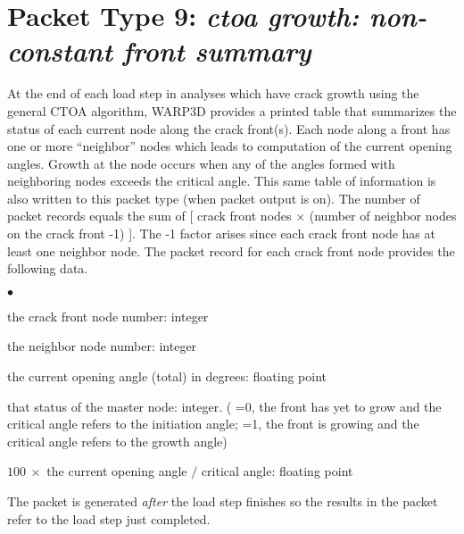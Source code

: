 \documentclass[10pt]{report}
\numberwithin{equation}{section}
\newcommand{\ti}{\emph}
\newcommand{\squishlist}{
 \begin{list}{$\bullet$}
  { \setlength{\itemsep}{0pt}
     \setlength{\parsep}{3pt}
     \setlength{\topsep}{3pt}
     \setlength{\partopsep}{0pt}
     \setlength{\leftmargin}{1.5em}
     \setlength{\labelwidth}{1em}
     \setlength{\labelsep}{0.5em} } }
\newcommand{\squishend}{
  \end{list}  }
\begin{document}
%
%
\section{Packet Type 9: \ti{ctoa growth: non-constant front summary}}
At the end of each load step in analyses which have crack growth using the 
general CTOA algorithm, WARP3D provides a printed table that summarizes 
the status of each current node along the crack front(s). Each node along a 
front has one or more ``neighbor'' nodes which leads to computation of the 
current opening angles. Growth at the node occurs when any of the angles 
formed with neighboring nodes exceeds the critical angle. This same table 
of information is also written to this packet type (when packet output is on).
The number of packet records equals the sum of [ crack front nodes $\times$ (number of 
neighbor nodes on the crack front -1) ]. The -1 factor arises since each crack 
front node has at least one neighbor node. The packet record for each crack 
front node provides the following data.
\squishlist
\item the crack front node number:  integer
\item the neighbor node number: integer
\item the current opening angle (total) in degrees:  floating point
\item that status of the master node:  integer. ( =0, the front has yet to grow and the 
critical angle refers to the initiation angle;  =1, the front is growing and the critical angle 
refers to the growth angle)
\item $100\ \times$ the current opening angle $/$  critical angle:  floating point
\squishend
\noindent The packet is generated \ti{after} the load step finishes so the results in the packet 
refer to the load step just completed.

%
%
\end{document}
